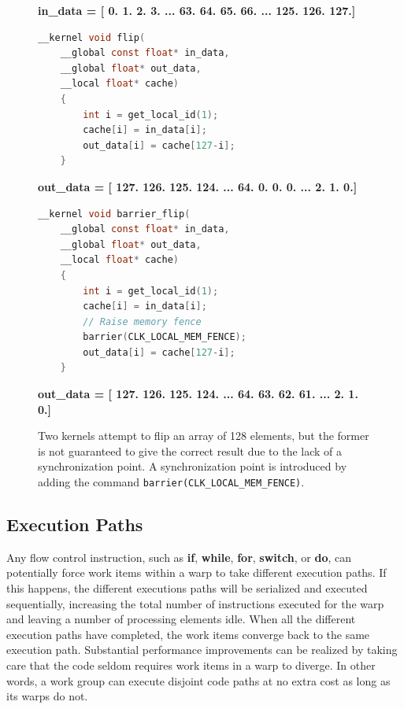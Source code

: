 \documentclass[11pt,twoside]{report}
\begin{document}
\begin{figure}[htbp]
	\vspace{-20pt}
	\begin{center}
	
{\bf{\ttfamily\selectfont in\_data = [   0.    1.    2.    3.   ...   63.   64.   65.   66.   ...   125.  126.  127.]}}

	\begin{lstlisting}[language=C, style=my_C]
	__kernel void flip(
	__global const float* in_data,
	__global float* out_data,
	__local float* cache)
	{
		int i = get_local_id(1);
		cache[i] = in_data[i];
		out_data[i] = cache[127-i];
	}
	\end{lstlisting}

{\bf{\ttfamily\selectfont out\_data = [ 127.  126.  125.  124.  ...  64.    {\color{bloody}0.    0.    0.}  ...  2.    1.    0.]}}

	\begin{lstlisting}[language=C, style=my_C]
	__kernel void barrier_flip(
	__global const float* in_data,
	__global float* out_data,
	__local float* cache)
	{
		int i = get_local_id(1);
		cache[i] = in_data[i];
		// Raise memory fence 
		barrier(CLK_LOCAL_MEM_FENCE);		
		out_data[i] = cache[127-i];
	}
	\end{lstlisting}

{\bf{\ttfamily\selectfont out\_data =  [ 127.  126.  125.  124.  ...  64.   63.   62.   61.  ...  2.    1.    0.]}}

\caption{Two kernels attempt to flip an array of 128 elements, but the former is not guaranteed to give the correct result due to the lack of a synchronization point. A synchronization point is introduced by adding the 
command {\tt barrier(CLK\_LOCAL\_MEM\_FENCE)}.\label{code:barrier}}
\end{center}

\end{figure}


\subsection{Execution Paths}
Any flow control instruction, such as {\bf if}, {\bf while}, {\bf for}, {\bf switch}, or {\bf do}, can potentially force work items within a warp to take different execution paths. If this happens, the different
executions paths will be serialized and executed sequentially, increasing the total number of instructions
executed for the warp and leaving a number of processing elements idle. When all the different execution paths have completed, the work items converge back to the same execution path. Substantial performance improvements can be realized by taking care that the code seldom requires work items in a warp to diverge. In other words, a work group can execute disjoint code paths at no extra cost as long as its warps do not.
\end{document}
